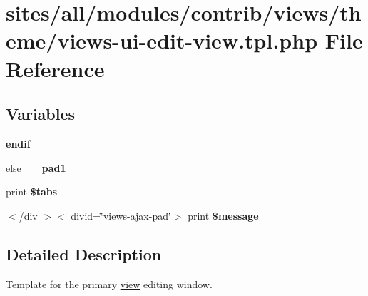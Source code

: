 \hypertarget{views-ui-edit-view_8tpl_8php}{
\section{sites/all/modules/contrib/views/theme/views-ui-edit-view.tpl.php File Reference}
\label{views-ui-edit-view_8tpl_8php}
}
\subsection*{Variables}
\begin{CompactItemize}
\item 
\hypertarget{views-ui-edit-view_8tpl_8php_82cd33ca97ff99f2fcc5e9c81d65251b}{
\textbf{endif}}
\label{views-ui-edit-view_8tpl_8php_82cd33ca97ff99f2fcc5e9c81d65251b}

\item 
\hypertarget{views-ui-edit-view_8tpl_8php_e8b4bb1441c6ab4dcb28a37bc46c8ead}{
else \textbf{\_\-\_\-pad1\_\-\_\-}}
\label{views-ui-edit-view_8tpl_8php_e8b4bb1441c6ab4dcb28a37bc46c8ead}

\item 
\hypertarget{views-ui-edit-view_8tpl_8php_442ec3e86534b83e833f5a2a7110ece0}{
print \textbf{\$tabs}}
\label{views-ui-edit-view_8tpl_8php_442ec3e86534b83e833f5a2a7110ece0}

\item 
\hypertarget{views-ui-edit-view_8tpl_8php_c78b116c9a3de39786b1a1c89a73ca8e}{
$<$/div $>$$<$ divid=\char`\"{}views-ajax-pad\char`\"{}$>$ print \textbf{\$message}}
\label{views-ui-edit-view_8tpl_8php_c78b116c9a3de39786b1a1c89a73ca8e}

\end{CompactItemize}


\subsection{Detailed Description}
Template for the primary \hyperlink{classview}{view} editing window. 
